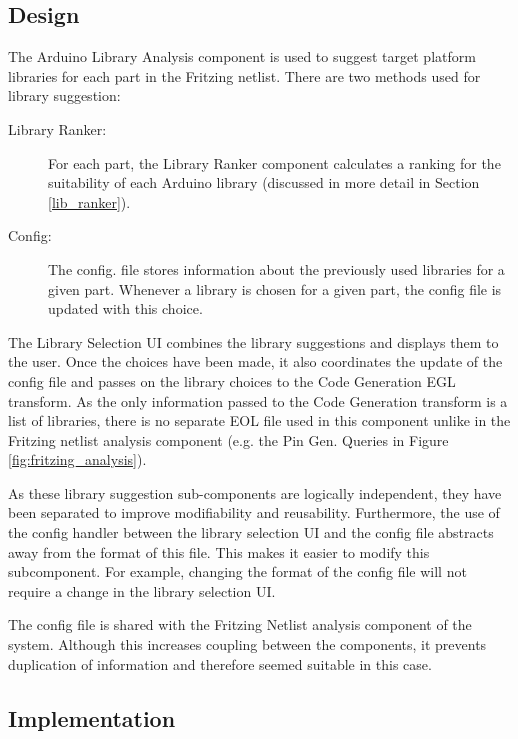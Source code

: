 \documentclass{UoYCSproject}
\begin{document}
\subsection{Design}
The Arduino Library Analysis component is used to suggest target platform libraries for each part in the Fritzing netlist. There are two methods used for library suggestion:
\begin{description}
\item[Library Ranker:] For each part, the Library Ranker component calculates a ranking for the suitability of each Arduino library (discussed in more detail in Section \ref{lib_ranker}).
\item[Config:] The config. file stores information about the previously used libraries for a given part. Whenever a library is chosen for a given part, the config file is updated with this choice. 
\end{description}

The Library Selection UI combines the library suggestions and displays them to the user. Once the choices have been made, it also coordinates the update of the config file and passes on the library choices to the Code Generation EGL transform. As the only information passed to the Code Generation transform is a list of libraries, there is no separate EOL file used in this component unlike in the Fritzing netlist analysis component (e.g. the Pin Gen. Queries in Figure \ref{fig:fritzing_analysis}).

As these library suggestion sub-components are logically independent, they have been separated to improve modifiability and reusability. Furthermore, the use of the config handler between the library selection UI and the config file abstracts away from the format of this file. This makes it easier to modify this subcomponent. For example, changing the format of the config file will not require a change in the library selection UI.

The config file is shared with the Fritzing Netlist analysis component of the system. Although this increases coupling between the components, it prevents duplication of information and therefore seemed suitable in this case.

\subsection{Implementation}
\end{document}
